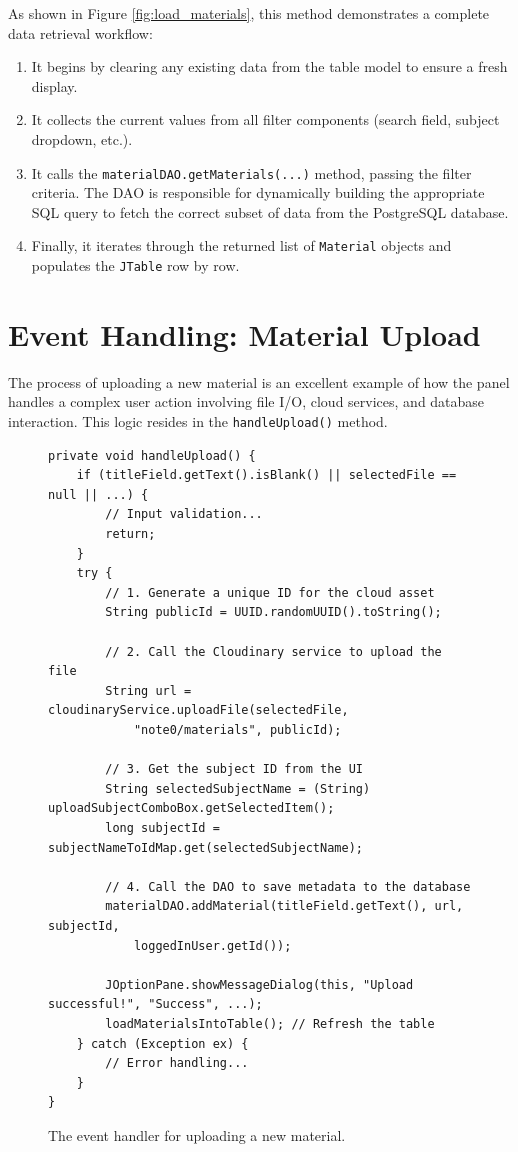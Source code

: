 \documentclass[12pt, a4paper]{report}
\begin{document}
\begin{itemize}
As shown in Figure \ref{fig:load_materials}, this method demonstrates a complete data retrieval workflow:
\begin{enumerate}
    \item It begins by clearing any existing data from the table model to ensure a fresh display.
    \item It collects the current values from all filter components (search field, subject dropdown, etc.).
    \item It calls the \texttt{materialDAO.getMaterials(...)} method, passing the filter criteria. The DAO is responsible for dynamically building the appropriate SQL query to fetch the correct subset of data from the PostgreSQL database.
    \item Finally, it iterates through the returned list of \texttt{Material} objects and populates the \texttt{JTable} row by row.
\end{enumerate}

\section{Event Handling: Material Upload}
The process of uploading a new material is an excellent example of how the panel handles a complex user action involving file I/O, cloud services, and database interaction. This logic resides in the \texttt{handleUpload()} method.

\begin{figure}[h!]
\begin{verbatim}
private void handleUpload() {
    if (titleField.getText().isBlank() || selectedFile == null || ...) {
        // Input validation...
        return;
    }
    try {
        // 1. Generate a unique ID for the cloud asset
        String publicId = UUID.randomUUID().toString();

        // 2. Call the Cloudinary service to upload the file
        String url = cloudinaryService.uploadFile(selectedFile, 
            "note0/materials", publicId);
        
        // 3. Get the subject ID from the UI
        String selectedSubjectName = (String) uploadSubjectComboBox.getSelectedItem();
        long subjectId = subjectNameToIdMap.get(selectedSubjectName);
        
        // 4. Call the DAO to save metadata to the database
        materialDAO.addMaterial(titleField.getText(), url, subjectId, 
            loggedInUser.getId());
        
        JOptionPane.showMessageDialog(this, "Upload successful!", "Success", ...);
        loadMaterialsIntoTable(); // Refresh the table
    } catch (Exception ex) {
        // Error handling...
    }
}
\end{verbatim}
\caption{The event handler for uploading a new material.}
\label{fig:handle_upload}
\end{figure}


\end{itemize}
\end{document}
